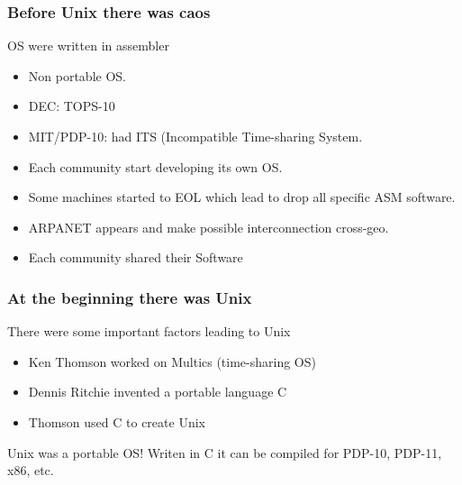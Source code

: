 \documentclass[hyperref={pdfpagelabels=false},xcolor=pst,pdf,fragile]{beamer}
\begin{document}
\begin{frame}
  \frametitle{Before Unix there was caos}

  \begin{block}{OS were written in assembler}
	  \begin{itemize}
		  \item Non portable OS.
		  \item DEC: TOPS-10
		  \item MIT/PDP-10: had ITS (Incompatible Time-sharing System.
	  \end{itemize}
  \end{block}

  \begin{itemize}
	  \item Each community start developing its own OS.
	  \item Some machines started to EOL which lead to drop all specific
		  ASM software.
	  \item ARPANET appears and make possible interconnection cross-geo.
	  \item \alert{Each community shared their Software}
  \end{itemize}

\end{frame}

\begin{frame}
  \frametitle{At the beginning there was Unix}

  There were some important factors leading to Unix

  \begin{itemize}
	  \item Ken Thomson worked on Multics (time-sharing OS)
	  \item Dennis Ritchie invented a portable language C
	  \item Thomson used C to create Unix
  \end{itemize}

  \pause

  \begin{alertblock}{Unix was a portable OS!}
	  Writen in C it can be compiled for PDP-10, PDP-11, x86, etc.
  \end{alertblock}

\end{frame}
\end{document}
